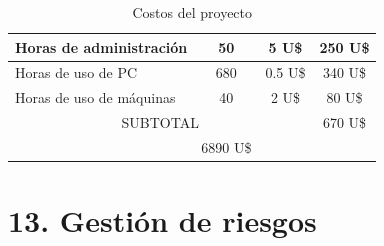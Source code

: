 \documentclass[
11pt, %
]{charter}
\begin{document}
\begin{table}[htpb]
\begin{tabularx}{\linewidth}{@{}|X|c|r|r|@{}}
Horas de administración &
  \multicolumn{1}{c|}{50} &
  \multicolumn{1}{c|}{5 U\$} &
  \multicolumn{1}{c|}{250 U\$} \\ \hline 

Horas de uso de PC &
  \multicolumn{1}{c|}{680} &
  \multicolumn{1}{c|}{0.5 U\$} &
  \multicolumn{1}{c|}{340 U\$} \\ \hline 
  
Horas de uso de máquinas &
  \multicolumn{1}{c|}{40} &
  \multicolumn{1}{c|}{2 U\$} &
  \multicolumn{1}{c|}{80 U\$} \\ \hline 

\multicolumn{3}{|c|}{SUBTOTAL} &
  \multicolumn{1}{c|}{670 U\$} \\ \hline
\rowcolor[HTML]{C0C0C0}
\multicolumn{3}{|c|}{TOTAL} &
\multicolumn{1}{c|}{6890 U\$}
   \\ \hline
\end{tabularx}%
\caption{Costos del proyecto}
\label{tab:costosProyecto}
\end{table}


\section{13. Gestión de riesgos}
\label{sec:riesgos}
\end{document}
